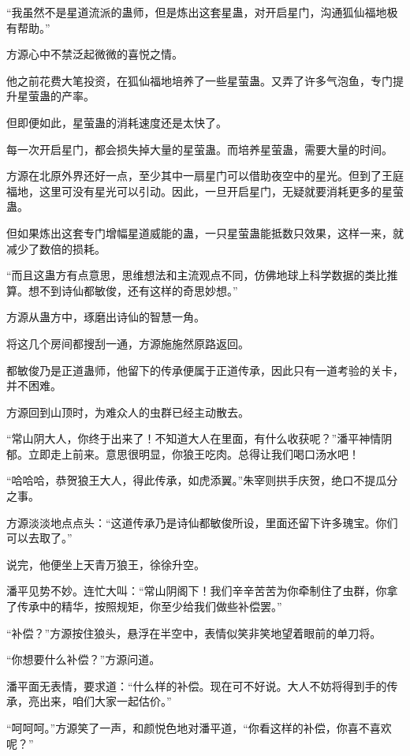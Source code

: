 
\begin{this_body}

“我虽然不是星道流派的蛊师，但是炼出这套星蛊，对开启星门，沟通狐仙福地极有帮助。”

方源心中不禁泛起微微的喜悦之情。

他之前花费大笔投资，在狐仙福地培养了一些星萤蛊。又弄了许多气泡鱼，专门提升星萤蛊的产率。

但即便如此，星萤蛊的消耗速度还是太快了。

每一次开启星门，都会损失掉大量的星萤蛊。而培养星萤蛊，需要大量的时间。

方源在北原外界还好一点，至少其中一扇星门可以借助夜空中的星光。但到了王庭福地，这里可没有星光可以引动。因此，一旦开启星门，无疑就要消耗更多的星萤蛊。

但如果炼出这套专门增幅星道威能的蛊，一只星萤蛊能抵数只效果，这样一来，就减少了数倍的损耗。

“而且这蛊方有点意思，思维想法和主流观点不同，仿佛地球上科学数据的类比推算。想不到诗仙都敏俊，还有这样的奇思妙想。”

方源从蛊方中，琢磨出诗仙的智慧一角。

将这几个房间都搜刮一通，方源施施然原路返回。

都敏俊乃是正道蛊师，他留下的传承便属于正道传承，因此只有一道考验的关卡，并不困难。

方源回到山顶时，为难众人的虫群已经主动散去。

“常山阴大人，你终于出来了！不知道大人在里面，有什么收获呢？”潘平神情阴郁。立即走上前来。意思很明显，你狼王吃肉。总得让我们喝口汤水吧！

“哈哈哈，恭贺狼王大人，得此传承，如虎添翼。”朱宰则拱手庆贺，绝口不提瓜分之事。

方源淡淡地点点头：“这道传承乃是诗仙都敏俊所设，里面还留下许多瑰宝。你们可以去取了。”

说完，他便坐上天青万狼王，徐徐升空。

潘平见势不妙。连忙大叫：“常山阴阁下！我们辛辛苦苦为你牵制住了虫群，你拿了传承中的精华，按照规矩，你至少给我们做些补偿罢。”

“补偿？”方源按住狼头，悬浮在半空中，表情似笑非笑地望着眼前的单刀将。

“你想要什么补偿？”方源问道。

潘平面无表情，要求道：“什么样的补偿。现在可不好说。大人不妨将得到手的传承，亮出来，咱们大家一起估价。”

“呵呵呵。”方源笑了一声，和颜悦色地对潘平道，“你看这样的补偿，你喜不喜欢呢？”


\end{this_body}
